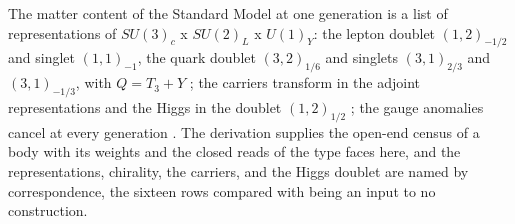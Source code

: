 \begin{chbridge}
The matter content of the Standard Model at one generation is a list of representations of $SU(3)_c$ x $SU(2)_L$ x $U(1)_Y$: the lepton doublet $(1,2)_{-1/2}$ and singlet $(1,1)_{-1}$, the quark doublet $(3,2)_{1/6}$ and singlets $(3,1)_{2/3}$ and $(3,1)_{-1/3}$, with $Q = T_3 + Y$ \cite{Weinberg1967,FritzschGellMannLeutwyler1973}; the carriers transform in the adjoint representations and the Higgs in the doublet $(1,2)_{1/2}$ \cite{Weinberg1967}; the gauge anomalies cancel at every generation \cite{Bouchiat1972,GeorgiGlashow1974}. The derivation supplies the open-end census of a body with its weights and the closed reads of the type faces here, and the representations, chirality, the carriers, and the Higgs doublet are named by correspondence, the sixteen rows compared with being an input to no construction.
\end{chbridge}
